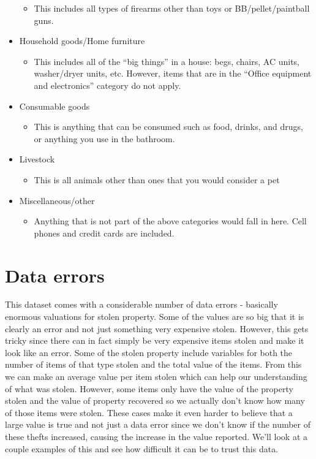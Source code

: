 \documentclass[
  12pt,
  openany]{book}
\providecommand{\tightlist}{%
  \setlength{\itemsep}{0pt}\setlength{\parskip}{0pt}}
\begin{document}
\begin{itemize}
  \begin{itemize}
  \tightlist
  \item
    This includes all types of firearms other than toys or BB/pellet/paintball guns.
  \end{itemize}
\item
  Household goods/Home furniture

  \begin{itemize}
  \tightlist
  \item
    This includes all of the ``big things'' in a house: begs, chairs, AC units, washer/dryer units, etc. However, items that are in the ``Office equipment and electronics'' category do not apply.
  \end{itemize}
\item
  Consumable goods

  \begin{itemize}
  \tightlist
  \item
    This is anything that can be consumed such as food, drinks, and drugs, or anything you use in the bathroom.
  \end{itemize}
\item
  Livestock

  \begin{itemize}
  \tightlist
  \item
    This is all animals other than ones that you would consider a pet
  \end{itemize}
\item
  Miscellaneous/other

  \begin{itemize}
  \tightlist
  \item
    Anything that is not part of the above categories would fall in here. Cell phones and credit cards are included.
  \end{itemize}
\end{itemize}

\hypertarget{data-errors}{%
\section{Data errors}\label{data-errors}}

This dataset comes with a considerable number of data errors - basically enormous valuations for stolen property. Some of the values are so big that it is clearly an error and not just something very expensive stolen. However, this gets tricky since there can in fact simply be very expensive items stolen and make it look like an error. Some of the stolen property include variables for both the number of items of that type stolen and the total value of the items. From this we can make an average value per item stolen which can help our understanding of what was stolen. However, some items only have the value of the property stolen and the value of property recovered so we actually don't know how many of those items were stolen. These cases make it even harder to believe that a large value is true and not just a data error since we don't know if the number of these thefts increased, causing the increase in the value reported. We'll look at a couple examples of this and see how difficult it can be to trust this data.
\end{document}
